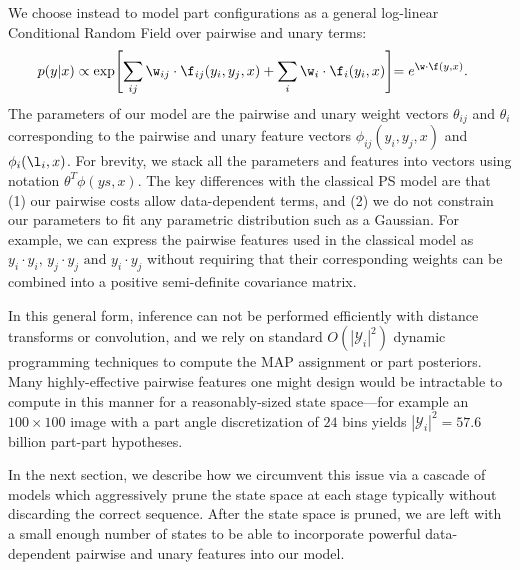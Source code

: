 \label{subsec:our_ps}
We choose instead to model part configurations as a general log-linear Conditional Random Field over pairwise and unary terms:
\begin{align}
p( y | x) &\propto \exp \Biggl[\sum_{ij} \w_{ij} \cdot \f_{ij}(y_i,y_j,x) +
\sum_i \w_i \cdot \f_i(y_i,x) \Biggl] = e^{\w \cdot \f(y,x)}.
\end{align}
The parameters of our model are the pairwise and unary weight vectors 
$\theta_{ij}$ and $\theta_i$ corresponding to the pairwise and unary feature 
vectors $\phi_{ij}(y_i,y_j,x)$ and $\phi_i(\l_i,x)$.  For brevity, we stack all 
the parameters and features into vectors using notation $\theta^T \phi(ys,x)$.  
The key differences with the classical PS model are that (1) our pairwise costs 
allow data-dependent terms, and (2) we do not constrain our parameters to fit 
any parametric distribution such as a Gaussian.  For example, we can express 
the pairwise features used in the classical model as $y_{i} \cdot y_{i} \text{, 
} y_{j}\cdot y_{j} \text{ and }  y_{i}\cdot y_{j}$ without requiring that their 
corresponding weights can be combined into a positive semi-definite covariance 
matrix.

In this general form, inference can not be performed efficiently with distance transforms or convolution, and we rely on standard $O(|\mathcal{Y}_i|^2)$ dynamic programming techniques to compute the MAP assignment or part posteriors.  Many highly-effective pairwise features one might design would be intractable to compute in this manner for a reasonably-sized state space---for example an $100\times100$ image with a part angle discretization of $24$ bins yields $|\mathcal{Y}_i|^2 = 57.6$ billion part-part hypotheses.

In the next section, we describe how we circumvent this issue via a cascade of models which aggressively prune the state space at each stage typically without discarding the correct sequence.  After the state space is pruned, we are left with a small enough number of states to be able to incorporate powerful data-dependent pairwise and unary features into our model.


